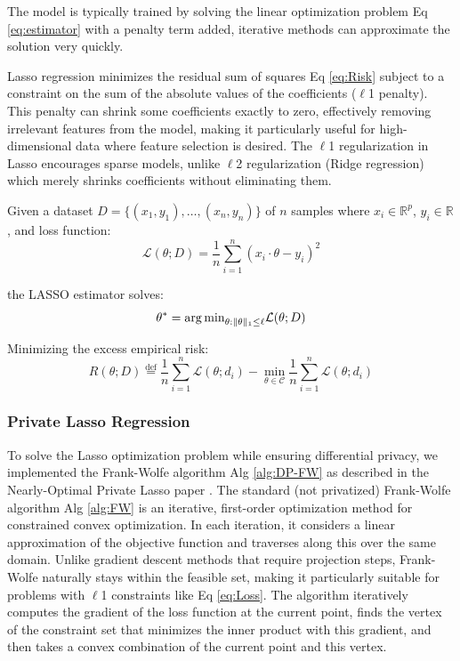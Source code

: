 \documentclass[12pt,letterpaper]{article}
\begin{document}
The model is typically trained by solving the linear optimization problem Eq \ref{eq:estimator} with a penalty term added, iterative methods can approximate the solution very quickly.

Lasso regression minimizes the residual sum of squares Eq \ref{eq:Risk} subject to a constraint on the sum of the absolute values of the coefficients ($\ell$1 penalty). This penalty can shrink some coefficients exactly to zero, effectively removing irrelevant features from the model, making it particularly useful for high-dimensional data where feature selection is desired. The $\ell$1 regularization in Lasso encourages sparse models, unlike $\ell$2 regularization (Ridge regression) which merely shrinks coefficients without eliminating them.

Given a dataset $D = \{(x_1, y_1), \ldots, (x_n, y_n)\}$ of $n$ samples where $x_i \in \mathbb{R}^p$, $y_i \in \mathbb{R}$, and loss function:
\begin{equation}
    \label{eq:Loss}
    \mathcal{L}(\theta; D) = \frac{1}{n}\sum_{i=1}^{n}(x_i \cdot \theta - y_i)^2
\end{equation}

the LASSO estimator solves:
\begin{equation}
    \label{eq:estimator}
    \theta^* = {\arg \min}_{\theta: \space \|\theta\|_1 \leq \ell} \mathcal{L}(\theta; D)
\end{equation}

Minimizing the excess empirical risk:
\begin{equation}
    \label{eq:Risk}
    R(\theta; D) \stackrel{\text{def}}{=} \frac{1}{n}\sum_{i=1}^{n}\mathcal{L}(\theta; d_i) - \min_{\theta \in \mathcal{C}}\frac{1}{n}\sum_{i=1}^{n}\mathcal{L}(\theta; d_i)
\end{equation}


\subsubsection{Private Lasso Regression}

To solve the Lasso optimization problem while ensuring differential privacy, we implemented the Frank-Wolfe algorithm Alg \ref{alg:DP-FW} as described in the Nearly-Optimal Private Lasso paper \cite{NIPS2015_52d080a3}. The standard (not privatized) Frank-Wolfe algorithm Alg \ref{alg:FW} is an iterative, first-order optimization method for constrained convex optimization. In each iteration, it considers a linear approximation of the objective function and traverses along this over the same domain. Unlike gradient descent methods that require projection steps, Frank-Wolfe naturally stays within the feasible set, making it particularly suitable for problems with $\ell$1 constraints like Eq \ref{eq:Loss}. The algorithm iteratively computes the gradient of the loss function at the current point, finds the vertex of the constraint set that minimizes the inner product with this gradient, and then takes a convex combination of the current point and this vertex.
\end{document}
